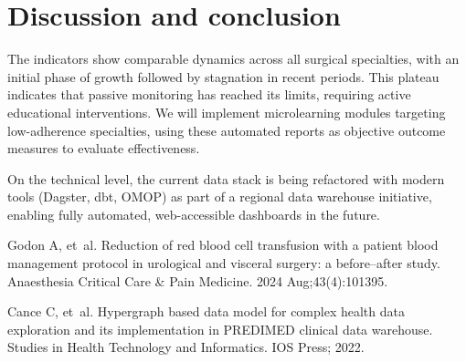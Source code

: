 \documentclass{IOS-Book-Article}
\begin{document}
\section{Discussion and conclusion}

The indicators show comparable dynamics across all surgical specialties, with an initial phase of growth followed by stagnation in recent periods.
This plateau indicates that passive monitoring has reached its limits, requiring active educational interventions. 
We will implement microlearning modules targeting low-adherence specialties, using these automated reports as objective outcome measures to evaluate effectiveness.

On the technical level, the current data stack is being refactored with modern tools (Dagster, dbt, OMOP) as part of a regional data warehouse initiative, enabling fully automated, web-accessible dashboards in the future.

\begin{thebibliography}{99}

Godon A, et~al. Reduction of red blood cell transfusion with a patient blood management protocol in urological and visceral surgery: a before–after study. Anaesthesia Critical Care \& Pain Medicine. 2024 Aug;43(4):101395.

Cance C, et~al. Hypergraph based data model for complex health data exploration and its implementation in PREDIMED clinical data warehouse. Studies in Health Technology and Informatics. IOS Press; 2022.

\end{thebibliography}
\end{document}
